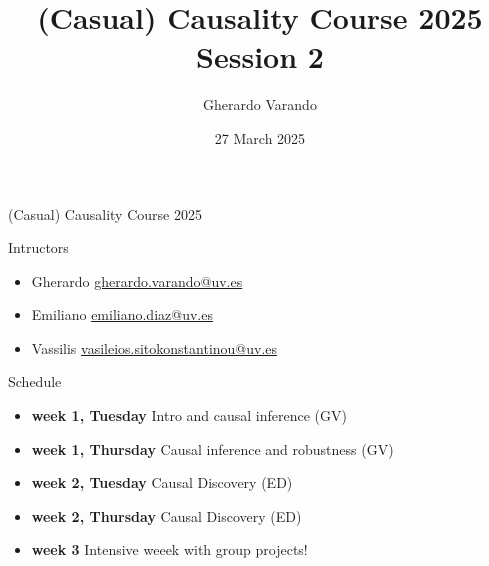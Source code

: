 \documentclass{beamer}
\institute[]{}
\title{(Casual) Causality Course 2025 \\ Session 2}
\author{Gherardo Varando}
\date{27 March 2025}
\begin{document}
\begin{frame}
\maketitle
\end{frame}

\begin{frame}{(Casual) Causality Course 2025}

	\begin{block}{Intructors}
	  \begin{itemize}
	    \item Gherardo \url{gherardo.varando@uv.es}
	    \item Emiliano \url{emiliano.diaz@uv.es} 
	    \item Vassilis \url{vasileios.sitokonstantinou@uv.es}
	  \end{itemize}
	\end{block}
	
	\begin{block}{Schedule} 
         \begin{itemize}
	   \item \textbf{week 1, Tuesday} Intro and causal inference (GV)
	   \item \textbf{week 1, Thursday} Causal inference and robustness (GV)    
	   \item \textbf{week 2, Tuesday} Causal Discovery (ED)
	   \item \textbf{week 2, Thursday} Causal Discovery (ED)
	   \item \textbf{week 3} Intensive weeek with group projects! 
	 \end{itemize}
	\end{block}


\end{frame}
\end{document}
